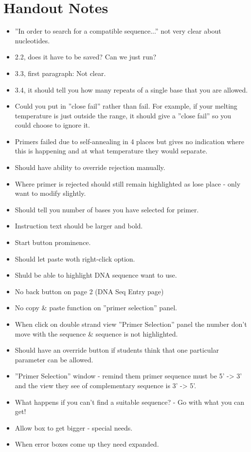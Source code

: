 \documentclass[a4paper]{article}
\begin{document}
\section{Handout Notes}
\begin{itemize}
	\item{''In order to search for a compatible sequence...'' not very clear about nucleotides.}
	\item{2.2, does it have to be saved? Can we just run?}
	\item{3.3, first paragraph: Not clear.}
	\item{3.4, it should tell you how many repeats of a single base that you are allowed.}
	\item{Could you put in ''close fail'' rather than fail. For example, if your melting temperature is just outside the range,
			it should give a ''close fail'' so you could choose to ignore it.}
	\item{Primers failed due to self-annealing in 4 places but gives no indication where this is happening and at what
			temperature they would separate.}
	\item{Should have ability to override rejection manually.}
	\item{Where primer is rejected should still remain highlighted as lose place - only want to modify slightly.}
	\item{Should tell you number of bases you have selected for primer.}
	\item{Instruction text should be larger and bold.}
	\item{Start button prominence.}
	\item{Should let paste woth right-click option.}
	\item{Shuld be able to highlight DNA sequence want to use.}
	\item{No back button on page 2 (DNA Seq Entry page)}
	\item{No copy \& paste function on ''primer selection'' panel.}
	\item{When click on double strand view ''Primer Selection'' panel the number don't move with the sequence \& sequence is not
			highlighted.}
	\item{Should have an override button if students think that one particular parameter can be allowed.}
	\item{''Primer Selection'' window - remind them primer sequence must be 5' -> 3' and the view they see of complementary
			sequence is 3' -> 5'.}
	\item{What happens if you can't find a suitable sequence? - Go with what you can get!}
	\item{Allow box to get bigger - special needs.}
	\item{When error boxes come up they need expanded.}
\end{itemize} 
	
\end{document}
